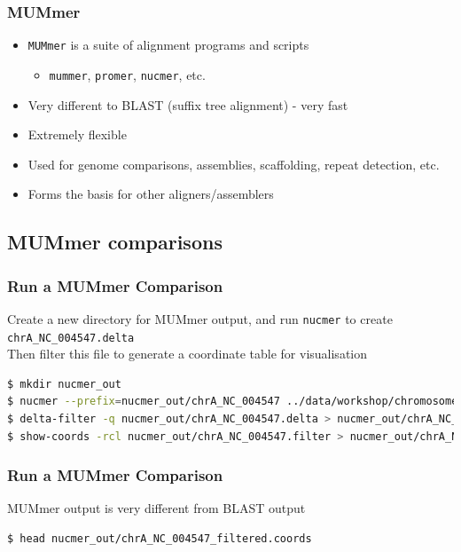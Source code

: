 \documentclass[table]{beamer}
\begin{document}
  \begin{frame}
    \frametitle{MUMmer}
    \begin{itemize}
      \item \texttt{MUMmer} is a suite of alignment programs and scripts
      \begin{itemize}
        \item \texttt{mummer}, \texttt{promer}, \texttt{nucmer}, etc.
      \end{itemize}
      \item Very different to BLAST (suffix tree alignment) - very fast
      \item Extremely flexible
      \item Used for genome comparisons, assemblies, scaffolding, repeat detection, etc.
      \item Forms the basis for other aligners/assemblers
    \end{itemize}
\end{frame}

  \subsection{MUMmer comparisons}
  \begin{frame}[fragile]
    \frametitle{Run a MUMmer Comparison}
    Create a new directory for MUMmer output, and run \texttt{nucmer} to create \texttt{chrA\_NC\_004547.delta} \\
    Then filter this file to generate a coordinate table for visualisation
    \begin{lstlisting}[language=bash]
$ mkdir nucmer_out
$ nucmer --prefix=nucmer_out/chrA_NC_004547 ../data/workshop/chromosomes/chrA.fasta ../data/workshop/chromosomes/NC_004547.fna
$ delta-filter -q nucmer_out/chrA_NC_004547.delta > nucmer_out/chrA_NC_004547.filter
$ show-coords -rcl nucmer_out/chrA_NC_004547.filter > nucmer_out/chrA_NC_004547_filtered.coords
    \end{lstlisting}
\end{frame}  

  \begin{frame}[fragile]
    \frametitle{Run a MUMmer Comparison}
    MUMmer output is very different from BLAST output
    \begin{lstlisting}[language=bash]
$ head nucmer_out/chrA_NC_004547_filtered.coords 

    \end{lstlisting}
\end{frame}  
\end{document}
